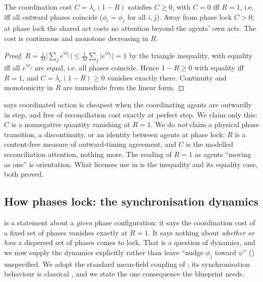 \documentclass[11pt,twocolumn,a4paper]{article}
\newcommand{\Ord}{R}                 %
\newcommand{\phase}{\phi}
\newcommand{\abs}[1]{\lvert#1\rvert}
\begin{document}
\begin{theorem}
\label{thm:phaselock}
The coordination cost $C=\lambda_c(1-\Ord)$ satisfies $C\ge0$, with
$C=0$ iff $\Ord=1$, i.e. iff all outward phases coincide
($\phase_i=\phase_j$ for all $i,j$). Away from phase lock $C>0$; at phase
lock the shared act costs no attention beyond the agents' own acts. The
cost is continuous and monotone decreasing in $\Ord$.
\end{theorem}

\begin{proof}
$\Ord=\frac1M\abs{\sum_j e^{i\phase_j}}\le\frac1M\sum_j\abs{e^{i\phase_j}}
=1$ by the triangle inequality, with equality iff all $e^{i\phase_j}$ are
equal, i.e. all phases coincide. Hence $1-\Ord\ge0$ with equality iff
$\Ord=1$, and $C=\lambda_c(1-\Ord)\ge0$ vanishes exactly there.
Continuity and monotonicity in $\Ord$ are immediate from the linear form.
\end{proof}

\begin{remark}
\label{rem:phaselock-scope}
 says coordinated action is cheapest when the
coordinating agents are outwardly in step, and free of reconciliation cost
exactly at perfect step. We claim only this: $C$ is a nonnegative quantity
vanishing at $\Ord=1$. We do \emph{not} claim a physical phase transition,
a discontinuity, or an identity between agents at phase lock; $\Ord$ is a
content-free measure of outward-timing agreement, and $C$ is the modelled
reconciliation attention, nothing more. The reading of $\Ord=1$ as agents
``moving as one'' is orientation. What licenses use in 
is the inequality and its equality case, both proved.
\end{remark}

\subsection{How phases lock: the synchronisation dynamics}
\label{sec:sync-dynamics}

 is a statement about a \emph{given} phase
configuration: it says the coordination cost of a fixed set of phases
vanishes exactly at $\Ord=1$. It says nothing about \emph{whether or how}
a dispersed set of phases comes to lock. That is a question of dynamics, and
we now supply the dynamics explicitly rather than leave ``nudge $\phase_j$
toward $\psi$'' () unspecified. We adopt the standard
mean-field coupling of \cite{kuramoto1984}; its synchronisation behaviour
is classical \cite{strogatz2000,acebron2005,pikovsky2001}, and we state
the one consequence the blueprint needs.
\end{document}
